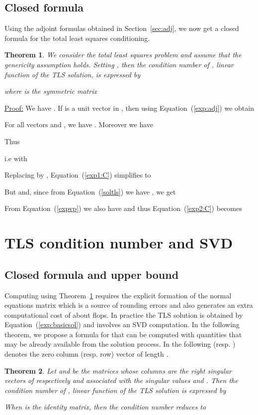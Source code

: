 \documentclass[a4paper]{article}
\newcommand{\finproof}{\begin{flushright}  \end{flushright}}
\newtheorem{theo}{Theorem}
\begin{document}
\subsection{Closed formula}
Using the adjoint formulas obtained in Section~\ref{sec:adj}, we now get a closed formula for the total least squares conditioning.
\begin{theo}
\label{theo:cond}
We consider the total least squares problem and assume that the genericity assumption holds.
Setting ,
then the condition number of , linear function of the TLS solution, is expressed by

where  is the  symmetric matrix

\end{theo}
{
\underline{Proof:}
We have
. If  is a unit vector in , then using Equation~(\ref{exp:adj}) we obtain

For all vectors  and , we have . Moreover we have

Thus

i.e
 with

Replacing  by
, Equation~(\ref{exp1:C}) simplifies to

But  and, since from Equation~(\ref{soltls}) we have ,
we get

From Equation~(\ref{expvp}) we also have  and thus
Equation~(\ref{exp2:C}) becomes

\finproof
}
\section{TLS condition number and SVD}
\subsection{Closed formula and upper bound}

Computing  using Theorem~\ref{theo:cond} requires the explicit formation of the normal equations matrix  which is a source of rounding errors and also generates an extra computational cost of about  flops. In practice the TLS solution is obtained by Equation~(\ref{exp:basicsol}) and involves an SVD computation.
In the following theorem, we propose a formula for  that can be computed with quantities that may be already available from the solution process.
In the following  (resp. ) denotes the zero column (resp. row) vector of length .
\begin{theo}
\label{theo:cntls}
Let  and  be the matrices whose columns are the right singular vectors of respectively  and  associated with the singular values
 and . Then the condition number of , linear function of the TLS solution is expressed by


When  is the identity matrix, then the condition number reduces to

\end{theo}
\end{document}
